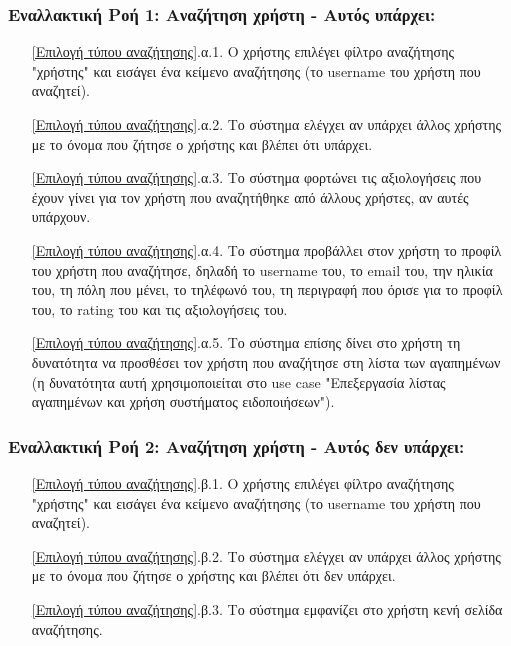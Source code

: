 \documentclass[12pt,a4paper]{article}
\begin{document}
\subsubsection*{Εναλλακτική Ροή 1: Αναζήτηση χρήστη - Αυτός υπάρχει:}
\begin{enumerate}
    \item[\ref{Επιλογή τύπου αναζήτησης}.α.1.] Ο χρήστης επιλέγει φίλτρο αναζήτησης "χρήστης" και εισάγει ένα κείμενο αναζήτησης (το username του χρήστη που αναζητεί).
    \item[\ref{Επιλογή τύπου αναζήτησης}.α.2.] Το σύστημα ελέγχει αν υπάρχει άλλος χρήστης με το όνομα που ζήτησε ο χρήστης και βλέπει ότι υπάρχει.
    \item[\ref{Επιλογή τύπου αναζήτησης}.α.3.] Το σύστημα φορτώνει τις αξιολογήσεις που έχουν γίνει για τον χρήστη που αναζητήθηκε από άλλους χρήστες, αν αυτές υπάρχουν.
    \item[\ref{Επιλογή τύπου αναζήτησης}.α.4.] Το σύστημα προβάλλει στον χρήστη το προφίλ του χρήστη που αναζήτησε, δηλαδή το username του, το email του, την ηλικία του, τη πόλη που μένει, το τηλέφωνό του, τη περιγραφή που όρισε για το προφίλ του, το rating του και τις αξιολογήσεις του.
    \item[\ref{Επιλογή τύπου αναζήτησης}.α.5.] Το σύστημα επίσης δίνει στο χρήστη τη δυνατότητα να προσθέσει τον χρήστη που αναζήτησε στη λίστα των αγαπημένων (η δυνατότητα αυτή χρησιμοποιείται στο use case "Επεξεργασία λίστας αγαπημένων και χρήση συστήματος ειδοποιήσεων").
\end{enumerate}

\subsubsection*{Εναλλακτική Ροή 2: Αναζήτηση χρήστη - Αυτός δεν υπάρχει:}
\begin{enumerate}
    \item[\ref{Επιλογή τύπου αναζήτησης}.β.1.] Ο χρήστης επιλέγει φίλτρο αναζήτησης "χρήστης" και εισάγει ένα κείμενο αναζήτησης (το username του χρήστη που αναζητεί).
    \item[\ref{Επιλογή τύπου αναζήτησης}.β.2.] Το σύστημα ελέγχει αν υπάρχει άλλος χρήστης με το όνομα που ζήτησε ο χρήστης και βλέπει ότι δεν υπάρχει.
    \item[\ref{Επιλογή τύπου αναζήτησης}.β.3.] Το σύστημα εμφανίζει στο χρήστη κενή σελίδα αναζήτησης.
\end{enumerate}
\end{document}
